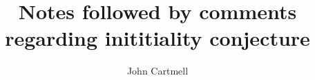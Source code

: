 \documentclass[10pt,a4paper]{article}
\theoremstyle{remark}
\begin{document}
\title{Notes followed by comments regarding inititiality conjecture}

\author{John Cartmell}

\maketitle

\newcommand{\gatU}{\gat[U]}
\newcommand{\gatUw}{\gatU\ }
\newcommand{\CofU}{\ccat[C](\gat[U])}
\newcommand{\KU}{K_{\gat[U]}}
\newcommand{\KUp}{K_{\gat[U']}}
\newcommand{\catCon}{\cat{Con}}
\newcommand{\catGAT}{\cat{GAT}}

\newcommand{\gatrule}[2]{$#1 \tstyle #2$}

\newcommand{\inlinedisplay}[1]
{
\setlength{\fboxsep}{1.5pt}
\setlength{\fboxrule}{0pt}
\fbox{$\displaystyle #1$}
}

\newcommand{\gatdisplayrule}[2]
{
\setlength{\fboxsep}{1pt}
\setlength{\fboxrule}{0pt}
\fbox{$\displaystyle \frac{#1}{#2}$}
}
\newcommand{\Isort}{I_{sort}}
\newcommand{\Iop}{I_{op}}
\newcommand {\Ihat}{\hat{I}}

\renewcommand{\crossx}[3]{#1 \underset{\tiny #3}{\cross} #2}
\newcommand{\fonestar}   {{f_1}\kern-.15em^*}
\newcommand{\ftwostar}   {{f_2}\kern-.15em^*}
\newcommand{\fjstar}     {{f_j}\kern-.2em^*}
\newcommand{\fjpstar}    {{f_{j-1}}\kern-.25em^*}
\newcommand{\smstar}{{s_m}\kern-.25em^*}
\newcommand{\sonestar}{{s_1}\kern-.15em^*}

\newcommand{\Trule} {T-rule\ }
\newcommand{\trule} {$\in$-rule\ }
\newcommand{\Teqrule} {T=-rule\ }
\newcommand{\teqrule} {$\in=$-rule\ }

\newcommand{\genericAintroductoryrule} {\gatdisplayrule{\xDelta{n}}{\isT{A(\xn}}}
\newcommand{\genericfintroductoryrule}  {\gatdisplayrule{\xDelta{n}}{\ofT{f(\xn)}{\Delta}}}

\newcommand{\Imapsto}{\scaleto{\mapsto}{10pt}}

\newcommand{\MAPTO}{&
\refstepcounter{equation}(\theequation) &&
$\mapsto$ &&}

\newcommand{\gatinterpretationdetail}[5]{
\refstepcounter{equation}(\theequation)\label{#1}& \gatrule{#2}{#3}&$\mapsto$&&$#4$&#5}

\newcommand{\gatinterpretationintro}[5]{
\refstepcounter{equation}(\theequation)\label{#1}& \gatrule{#2}{#3}&$\mapsto$&&\cellcolor{lightergrey}$#4$&#5}
\end{document}
